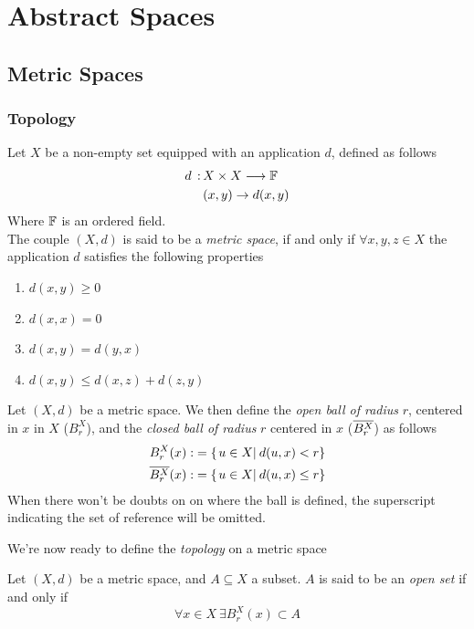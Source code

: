 \documentclass[../complete.tex]{subfiles}
\begin{document}
\chapter{Abstract Spaces}
\section{Metric Spaces}
\subsection{Topology}
\begin{dfn}
	Let $X$ be a non-empty set equipped with an application $d$, defined as follows
	\begin{equation}
		\begin{aligned}
			d\, :\, &X\times X\overset{}{\longrightarrow}\mathbb{F}\\
			&(x,y)\to d(x,y)
		\end{aligned}
		\label{eq:distdef}
	\end{equation}
	Where $\mathbb{F}$ is an ordered field.\\
	The couple $(X,d)$ is said to be a \textit{metric space}, if and only if $\forall x,y,z\in X$ the application $d$ satisfies the following properties
	\begin{enumerate}
	\item $d(x,y)\ge0$
	\item $d(x,x)=0$
	\item $d(x,y)=d(y,x)$
	\item $d(x,y)\le  d(x,z)+d(z,y)$
	\end{enumerate}
\end{dfn}
\begin{dfn}[Ball]
	Let $(X,d)$ be a metric space. We then define the \textit{open ball of radius} $r$, centered in $x$ in $X$ ($B_r^X$), and the \textit{closed ball of radius} $r$ centered in $x$ ($\overline{B_r^X}$) as follows
	\begin{equation}
		\begin{aligned}
			B_r^X(x):&=\{\left.u\in X\right|_{}d(u,x)<r\}\\
			\overline{B_r^X}(x):&=\{\left.u\in X\right|_{}d(u,x)\le r\}
		\end{aligned}
		\label{eq:openclosedball}
	\end{equation}
	When there won't be doubts on on where the ball is defined, the superscript indicating the set of reference will be omitted.
\end{dfn}
We're now ready to define the \textit{topology} on a metric space
\begin{dfn}
	Let $(X,d)$ be a metric space, and $A\subseteq X$ a subset. $A$ is said to be an \textit{open set} if and only if
	\begin{equation}
		\forall x\in X\ \exists B_r^X(x)\subset A
		\label{eq:opensetdef}
	\end{equation}
\end{dfn}
\end{document}
